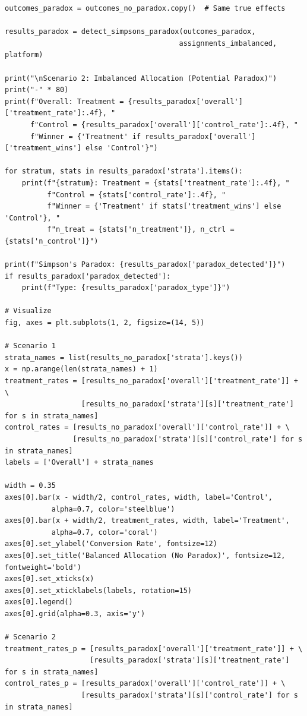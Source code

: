 \begin{lstlisting}
outcomes_paradox = outcomes_no_paradox.copy()  # Same true effects

results_paradox = detect_simpsons_paradox(outcomes_paradox,
                                         assignments_imbalanced, platform)

print("\nScenario 2: Imbalanced Allocation (Potential Paradox)")
print("-" * 80)
print(f"Overall: Treatment = {results_paradox['overall']['treatment_rate']:.4f}, "
      f"Control = {results_paradox['overall']['control_rate']:.4f}, "
      f"Winner = {'Treatment' if results_paradox['overall']['treatment_wins'] else 'Control'}")

for stratum, stats in results_paradox['strata'].items():
    print(f"{stratum}: Treatment = {stats['treatment_rate']:.4f}, "
          f"Control = {stats['control_rate']:.4f}, "
          f"Winner = {'Treatment' if stats['treatment_wins'] else 'Control'}, "
          f"n_treat = {stats['n_treatment']}, n_ctrl = {stats['n_control']}")

print(f"Simpson's Paradox: {results_paradox['paradox_detected']}")
if results_paradox['paradox_detected']:
    print(f"Type: {results_paradox['paradox_type']}")

# Visualize
fig, axes = plt.subplots(1, 2, figsize=(14, 5))

# Scenario 1
strata_names = list(results_no_paradox['strata'].keys())
x = np.arange(len(strata_names) + 1)
treatment_rates = [results_no_paradox['overall']['treatment_rate']] + \
                  [results_no_paradox['strata'][s]['treatment_rate'] for s in strata_names]
control_rates = [results_no_paradox['overall']['control_rate']] + \
                [results_no_paradox['strata'][s]['control_rate'] for s in strata_names]
labels = ['Overall'] + strata_names

width = 0.35
axes[0].bar(x - width/2, control_rates, width, label='Control',
           alpha=0.7, color='steelblue')
axes[0].bar(x + width/2, treatment_rates, width, label='Treatment',
           alpha=0.7, color='coral')
axes[0].set_ylabel('Conversion Rate', fontsize=12)
axes[0].set_title('Balanced Allocation (No Paradox)', fontsize=12, fontweight='bold')
axes[0].set_xticks(x)
axes[0].set_xticklabels(labels, rotation=15)
axes[0].legend()
axes[0].grid(alpha=0.3, axis='y')

# Scenario 2
treatment_rates_p = [results_paradox['overall']['treatment_rate']] + \
                    [results_paradox['strata'][s]['treatment_rate'] for s in strata_names]
control_rates_p = [results_paradox['overall']['control_rate']] + \
                  [results_paradox['strata'][s]['control_rate'] for s in strata_names]


\end{lstlisting}

